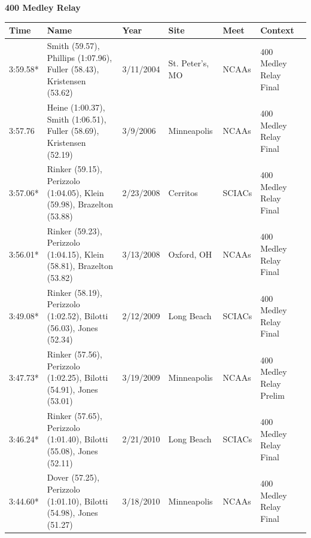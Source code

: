 \begin{table}[H]
\centering
\begin{minipage}[t]{0.6\textwidth}
\centering
\textbf{400 Medley Relay}\\[0.1cm]
\begin{tabular}{@{}p{1.8cm}p{2.8cm}p{1.2cm}p{1.4cm}p{1.4cm}p{2.0cm}@{}}
\hline
    \textbf{Time} & \textbf{Name} & \textbf{Year} & \textbf{Site} & \textbf{Meet} & \textbf{Context} \\
\hline
    3:59.58* & Smith (59.57), Phillips (1:07.96), Fuller (58.43), Kristensen (53.62) & 3/11/2004 & St. Peter's, MO & NCAAs & 400 Medley Relay Final \\
    3:57.76 & Heine (1:00.37), Smith (1:06.51), Fuller (58.69), Kristensen (52.19) & 3/9/2006 & Minneapolis & NCAAs & 400 Medley Relay Final \\
    3:57.06* & Rinker (59.15), Perizzolo (1:04.05), Klein (59.98), Brazelton (53.88) & 2/23/2008 & Cerritos & SCIACs & 400 Medley Relay Final \\
    3:56.01* & Rinker (59.23), Perizzolo (1:04.15), Klein (58.81), Brazelton (53.82) & 3/13/2008 & Oxford, OH & NCAAs & 400 Medley Relay Final \\
    3:49.08* & Rinker (58.19), Perizzolo (1:02.52), Bilotti (56.03), Jones (52.34) & 2/12/2009 & Long Beach & SCIACs & 400 Medley Relay Final \\
    3:47.73* & Rinker (57.56), Perizzolo (1:02.25), Bilotti (54.91), Jones (53.01) & 3/19/2009 & Minneapolis & NCAAs & 400 Medley Relay Prelim \\
    3:46.24* & Rinker (57.65), Perizzolo (1:01.40), Bilotti (55.08), Jones (52.11) & 2/21/2010 & Long Beach & SCIACs & 400 Medley Relay Final \\
    3:44.60* & Dover (57.25), Perizzolo (1:01.10), Bilotti (54.98), Jones (51.27) & 3/18/2010 & Minneapolis & NCAAs & 400 Medley Relay Final \\
\hline
\end{tabular}
\end{minipage}
\end{table}


\newpage



